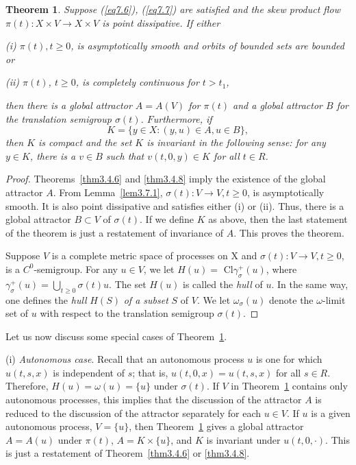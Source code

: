 \documentclass{surv-l}
\theoremstyle{plain}
\newtheorem{theorem}{Theorem}[section]
\theoremstyle{definition}
\numberwithin{equation}{section}
\numberwithin{figure}{chapter}
\begin{document}
\begin{theorem}\label{thm3.7.2} Suppose \emph{(\ref{eq7.6})}, \emph{(\ref{eq7.7})} are satisfied and the skew product flow
$\pi(t)\!:X\times V\rightarrow X\times V$ is point dissipative. If either

\emph{(i)} $\pi(t),t\geq 0$, is asymptotically smooth and orbits of bounded sets are bounded or

\emph{(ii)} $\pi(t)$, $t\geq 0$, is completely continuous for $t>t_{1}$,

\noindent then there is a global attractor $A=A(V)$ for $\pi(t)$ and a global attractor $B$ for the translation semigroup $\sigma(t)$. $F$urthermore, if
\begin{equation*}
K=\{y\in X\!:(y,u)\in A,u\in B\},
\end{equation*}
then $K$ is compact and the set $K$ is invariant in the following sense: for any $y\in K$, there is a $v\in B$ such that $v(t,0,y)\in K$ for all $t\in R$.
\end{theorem}

\begin{proof}Theorems~\ref{thm3.4.6} and \ref{thm3.4.8} imply the existence of the global attractor $A$. From Lemma~\ref{lem3.7.1}, $\sigma(t)\!:V\rightarrow V,t\geq 0$, is asymptotically smooth. It is also point dissipative and satisfies either (i) or (ii). Thus, there is a global attractor $B\subset V$ of $\sigma(t)$. If we define $K$ as above, then the last statement of the theorem is just a restatement of invariance of $A$. This proves the theorem.

Suppose $V$ is a complete metric space of processes on X and $\sigma(t)\!:V\rightarrow V,t\geq 0$, is a $C^{0}$-semigroup. For any $u\in V$, we let $H(u)=$ Cl$\gamma_{\sigma}^{+}(u)$, where $\gamma_{\sigma}^{+}(u)=\bigcup_{t\geq0}\sigma(t)u$. The set $H(u)$ is called the \emph{hull} of $u$. In the same way, one defines the \emph{hull} $H(S)$ \emph{of a subset} $S$ of $V$. We let $\omega_{\sigma}(u)$ denote the $\omega$-limit set of $u$ with respect to the translation semigroup $\sigma(t)$.
\end{proof}
Let us now discuss some special cases of Theorem~\ref{thm3.7.2}.

(i) \emph{Autonomous case}. Recall that an autonomous process $u$ is one for which $u(t, s, x)$ is independent of $s$; that is, $u(t, 0, x)=u(t, s, x)$ for all $s\in R$. Therefore, $H(u)=\omega(u)=\{u\}$ under $\sigma(t)$. If $V$ in Theorem~\ref{thm3.7.2} contains only autonomous processes, this implies that the discussion of the attractor $A$ is reduced to the discussion of the attractor separately for each $u\in V$. If $u$ is a given autonomous process, $V=\{u\}$, then Theorem~\ref{thm3.7.2} gives a global attractor $A=A(u)$ under $\pi(t)$, $A=K\times\{u\}$, and $K$ is invariant under $u(t,0,\cdot)$. This is just a restatement of Theorem~\ref{thm3.4.6} or \ref{thm3.4.8}.
\end{document}
